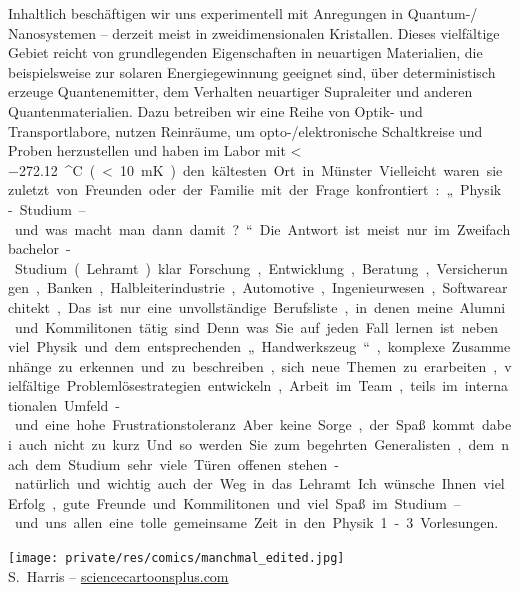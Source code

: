 \begin{multicols}{2}
Inhaltlich beschäftigen wir uns experimentell mit Anregungen in Quantum-/ Nanosystemen – derzeit meist in zweidimensionalen Kristallen. Dieses vielfältige Gebiet reicht von grundlegenden Eigenschaften in neuartigen Materialien, die beispielsweise zur solaren Energiegewinnung geeignet sind, über deterministisch erzeuge Quantenemitter, dem Verhalten neuartiger Supraleiter und anderen Quantenmaterialien. Dazu betreiben wir eine Reihe von Optik- und Transportlabore, nutzen Reinräume, um opto-/elektronische Schaltkreise und Proben herzustellen und haben im Labor mit < \SI{-272.12}{^\circ C} (<\SI{10} {\milli K}) den kältesten Ort in Münster. 

Vielleicht waren sie zuletzt von Freunden oder der Familie mit der Frage konfrontiert: „Physik-Studium – und was macht man dann damit?“ Die Antwort ist meist nur im Zweifachbachelor-Studium (Lehramt) klar. Forschung, Entwicklung, Beratung, Versicherungen, Banken, Halbleiterindustrie, Automotive, Ingenieurwesen, Softwarearchitekt, ... Das ist nur eine unvollständige Berufsliste, in denen meine Alumni und Kommilitonen tätig sind. Denn was Sie auf jeden Fall lernen ist neben viel Physik und dem entsprechenden „Handwerkszeug“, komplexe Zusammenhänge zu erkennen und zu beschreiben, sich neue Themen zu erarbeiten, vielfältige Problemlösestrategien entwickeln, Arbeit im Team, teils im internationalen Umfeld - und eine hohe Frustrationstoleranz. Aber keine Sorge, der Spaß kommt dabei auch nicht zu kurz. Und so werden Sie zum begehrten Generalisten, dem nach dem Studium sehr viele Türen offenen stehen - natürlich und wichtig auch der Weg in das Lehramt.

Ich wünsche Ihnen viel Erfolg, gute Freunde und Kommilitonen und viel Spaß im Studium – und uns allen eine tolle gemeinsame Zeit in den Physik 1-3 Vorlesungen. 

\begin{center}
\texttt{[image: private/res/comics/manchmal\_edited.jpg]}\\
{\footnotesize 
S.~Harris – \url{sciencecartoonsplus.com}
}
\end{center}

\end{multicols}

\vfill

\newpage

